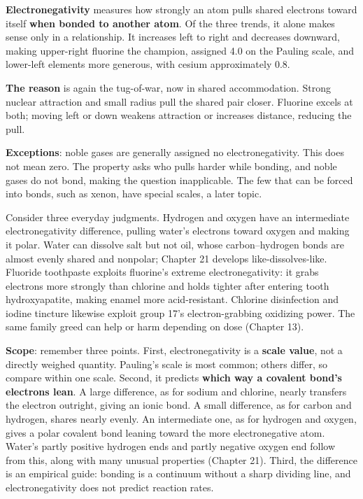 \textbf{Electronegativity} measures how strongly an atom pulls shared electrons toward itself \textbf{when bonded to another atom}. Of the three trends, it alone makes sense only in a relationship. It increases left to right and decreases downward, making upper-right fluorine the champion, assigned 4.0 on the Pauling scale, and lower-left elements more generous, with cesium approximately 0.8.

\textbf{The reason} is again the tug-of-war, now in shared accommodation. Strong nuclear attraction and small radius pull the shared pair closer. Fluorine excels at both; moving left or down weakens attraction or increases distance, reducing the pull.

\textbf{Exceptions}: noble gases are generally assigned no electronegativity. This does not mean zero. The property asks who pulls harder while bonding, and noble gases do not bond, making the question inapplicable. The few that can be forced into bonds, such as xenon, have special scales, a later topic.

Consider three everyday judgments. Hydrogen and oxygen have an intermediate electronegativity difference, pulling water's electrons toward oxygen and making it polar. Water can dissolve salt but not oil, whose carbon--hydrogen bonds are almost evenly shared and nonpolar; Chapter 21 develops like-dissolves-like. Fluoride toothpaste exploits fluorine's extreme electronegativity: it grabs electrons more strongly than chlorine and holds tighter after entering tooth hydroxyapatite, making enamel more acid-resistant. Chlorine disinfection and iodine tincture likewise exploit group 17's electron-grabbing oxidizing power. The same family greed can help or harm depending on dose (Chapter 13).

\textbf{Scope}: remember three points. First, electronegativity is a \textbf{scale value}, not a directly weighed quantity. Pauling's scale is most common; others differ, so compare within one scale. Second, it predicts \textbf{which way a covalent bond's electrons lean}. A large difference, as for sodium and chlorine, nearly transfers the electron outright, giving an ionic bond. A small difference, as for carbon and hydrogen, shares nearly evenly. An intermediate one, as for hydrogen and oxygen, gives a polar covalent bond leaning toward the more electronegative atom. Water's partly positive hydrogen ends and partly negative oxygen end follow from this, along with many unusual properties (Chapter 21). Third, the difference is an empirical guide: bonding is a continuum without a sharp dividing line, and electronegativity does not predict reaction rates.


